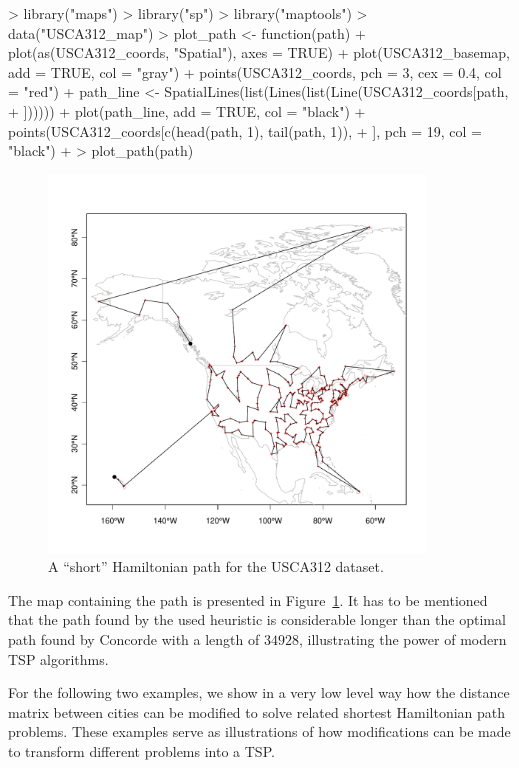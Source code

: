 \documentclass[10pt,a4paper,fleqn]{article}
\begin{document}
\begin{Schunk}
\begin{Sinput}
> library("maps")
> library("sp")
> library("maptools")
> data("USCA312_map")
> plot_path <- function(path) {
+     plot(as(USCA312_coords, "Spatial"), axes = TRUE)
+     plot(USCA312_basemap, add = TRUE, col = "gray")
+     points(USCA312_coords, pch = 3, cex = 0.4, col = "red")
+     path_line <- SpatialLines(list(Lines(list(Line(USCA312_coords[path, 
+         ])))))
+     plot(path_line, add = TRUE, col = "black")
+     points(USCA312_coords[c(head(path, 1), tail(path, 1)), 
+         ], pch = 19, col = "black")
+ }
> plot_path(path)
\end{Sinput}
\end{Schunk}

\begin{figure}
\centering
\includegraphics[width=10cm, trim=0 30 0 0]{TSP-map1}
\caption{A ``short'' Hamiltonian path for the USCA312 dataset.}
\label{fig:map1}
\end{figure}

The map containing the path is presented in Figure~\ref{fig:map1}.  It has to
be mentioned that the path found by the used heuristic is considerable longer
than the optimal path found by Concorde with a length of $34928$,
illustrating the power of modern TSP algorithms.

For the following two examples, we show in a very low level way how the
distance matrix between cities can be modified to solve related shortest
Hamiltonian path problems. These examples serve as illustrations of how
modifications can be made to transform different problems into a TSP.
\end{document}
